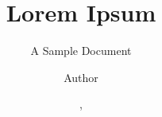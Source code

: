 \documentclass{format/style}
\title{Lorem Ipsum}
\subtitle{A Sample Document}
\author{Author}
\date{\monthname\ \the\day,\ \the\year}
\numberwithin{figure}{section} %
\numberwithin{table}{section} %
\begin{document}
\USNtitlepage
\tableofcontents

\twocolumn %



\printbibliography

\onecolumn %
\appendix %
\end{document}

